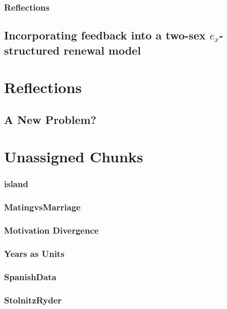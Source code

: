     \subsection{Reflections}
        
        
  \section{Incorporating feedback into a two-sex $e_x$-structured renewal model}


\chapter{Reflections}
  \section{A New Problem?}
    




\chapter{Unassigned Chunks}
\subsection{island}

\subsection{MatingvsMarriage}

\subsection{Motivation Divergence} 

\subsection{Years as Units}

\subsection{SpanishData}
 
\subsection{StolnitzRyder}
 
